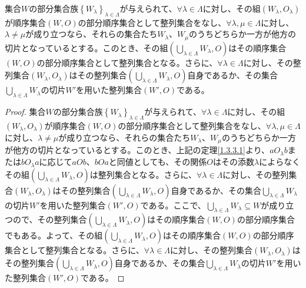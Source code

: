 \documentclass[dvipdfmx]{jsarticle}
\begin{document}
\begin{thm}\label{1.3.3.2}
集合$W$の部分集合族$\left\{ W_{\lambda} \right\}_{\lambda \in \varLambda }$が与えられて、$\forall\lambda \in \varLambda $に対し、その組$\left( W_{\lambda},O_{\lambda} \right)$が順序集合$(W,O)$の部分順序集合として整列集合をなし、$\forall\lambda,\mu \in \varLambda $に対し、$\lambda \neq \mu$が成り立つなら、それらの集合たち$W_{\lambda}$、$W_{\mu}$のうちどちらか一方が他方の切片となっているとする。このとき、その組$\left( \bigcup_{\lambda \in \varLambda } W_{\lambda},O \right)$はその順序集合$(W,O)$の部分順序集合として整列集合となる。さらに、$\forall\lambda \in \varLambda $に対し、その整列集合$\left( W_{\lambda},O_{\lambda} \right)$はその整列集合$\left( \bigcup_{\lambda \in \varLambda } W_{\lambda},O \right)$自身であるか、その集合$\bigcup_{\lambda \in \varLambda } W_{\lambda}$の切片$W'$を用いた整列集合$\left( W',O \right)$である。
\end{thm}
\begin{proof}
集合$W$の部分集合族$\left\{ W_{\lambda} \right\}_{\lambda \in \varLambda }$が与えられて、$\forall\lambda \in \varLambda $に対し、その組$\left( W_{\lambda},O_{\lambda} \right)$が順序集合$(W,O)$の部分順序集合として整列集合をなし、$\forall\lambda,\mu \in \varLambda $に対し、$\lambda \neq \mu$が成り立つなら、それらの集合たち$W_{\lambda}$、$W_{\mu}$のうちどちらか一方が他方の切片となっているとする。このとき、上記の定理\ref{1.3.3.1}より、$aO_{\lambda}b$または$bO_{\lambda}a$に応じて$aOb$、$bOa$と同値としても、その関係$O$はその添数$\lambda$によらなくその組$\left( \bigcup_{\lambda \in \varLambda } W_{\lambda},O \right)$は整列集合となる。さらに、$\forall\lambda \in \varLambda $に対し、その整列集合$\left( W_{\lambda},O_{\lambda} \right)$はその整列集合$\left( \bigcup_{\lambda \in \varLambda } W_{\lambda},O \right)$自身であるか、その集合$\bigcup_{\lambda \in \varLambda } W_{\lambda}$の切片$W'$を用いた整列集合$\left( W',O \right)$である。ここで、$\bigcup_{\lambda \in \varLambda } W_{\lambda} \subseteq W$が成り立つので、その整列集合$\left( \bigcup_{\lambda \in \varLambda } W_{\lambda},O \right)$はその順序集合$(W,O)$の部分順序集合でもある。よって、その組$\left( \bigcup_{\lambda \in \varLambda } W_{\lambda},O \right)$はその順序集合$(W,O)$の部分順序集合として整列集合となる。さらに、$\forall\lambda \in \varLambda $に対し、その整列集合$\left( W_{\lambda},O_{\lambda} \right)$はその整列集合$\left( \bigcup_{\lambda \in \varLambda } W_{\lambda},O \right)$自身であるか、その集合$\bigcup_{\lambda \in \varLambda } W_{\lambda}$の切片$W'$を用いた整列集合$\left( W',O \right)$である。
\end{proof}
\end{document}
